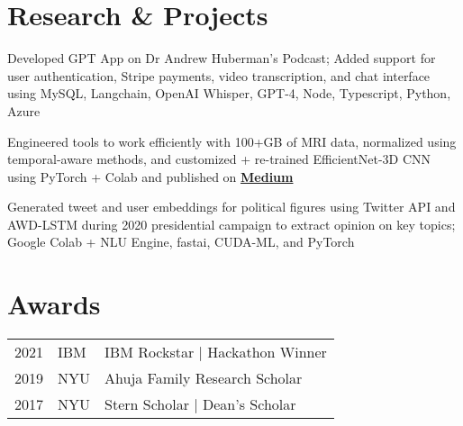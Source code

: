 \documentclass[]{deedy-resume-openfont}
\begin{document}
\begin{minipage}[t]{0.66\textwidth}

\section{Research \& Projects}

Developed GPT App on Dr Andrew Huberman's Podcast; Added support for user authentication, Stripe payments, video transcription, and chat interface using MySQL, Langchain, OpenAI Whisper, GPT-4, Node, Typescript, Python, Azure
\sectionsep

Engineered tools to work efficiently with 100+GB of MRI data, normalized using temporal-aware methods, and customized + re-trained EfficientNet-3D CNN using PyTorch + Colab and published on \href{https://by-tg.medium.com/how-i-took-part-in-kaggles-brain-tumor-detection-competition-with-drive-colab-opensource-10-8ed90c1df8fc}{\bf Medium}
\sectionsep

Generated tweet and user embeddings for political figures using Twitter API and AWD-LSTM during 2020 presidential campaign to extract opinion on key topics;
Google Colab + NLU Engine, fastai, CUDA-ML, and PyTorch
\sectionsep



\section{Awards} 
\begin{tabular}{rll}
2021	 & IBM & IBM Rockstar | Hackathon Winner \\
2019	 & NYU & Ahuja Family Research Scholar \\
2017     & NYU & Stern Scholar | Dean's Scholar \\
\end{tabular}
\sectionsep


% 
% 

\end{minipage} 
\end{document}
